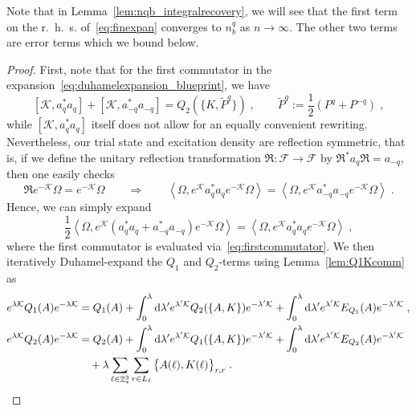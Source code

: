 \documentclass[12pt,a4paper]{article}
\numberwithin{equation}{section}
\newcommand{\cF}{\mathcal{F}}
\newcommand{\cK}{\mathcal{K}}
\newcommand{\fR}{\mathfrak{R}}
\newcommand{\1}{\mathbb{I}}
\newcommand{\di}{\textnormal{d}}
\DeclareMathOperator{\Z}{\mathbb{Z}}
\newcommand{\half}{\frac{1}{2}}
\newcommand{\eva}[1]{\left\langle #1 \right\rangle}
\theoremstyle{plain}
\theoremstyle{definition}
\theoremstyle{remark}
\theoremstyle{plain}
\theoremstyle{definition}
\theoremstyle{remark}
\begin{document}
Note that in Lemma~\ref{lem:nqb_integralrecovery}, we will see that the first term on the r.~h.~s. of~\eqref{eq:finexpan} converges to $ n_b^q $ as $ n \to \infty $. The other two terms are error terms which we bound below.


\begin{proof}
First, note that for the first commutator in the expansion~\eqref{eq:duhamelexpansion_blueprint}, we have
\begin{equation} \label{eq:firstcommutator}
	[\cK, a_q^* a_q] + [\cK, a_{-q}^* a_{-q}]
	= Q_2(\{K,\tilde{P}^q\}) \;, \qquad
	\tilde{P}^q := \half(P^q + P^{-q}) \;,
\end{equation}
while $ [\cK, a_q^* a_q] $ itself does not allow for an equally convenient rewriting. Nevertheless, our trial state and excitation density are reflection symmetric, that is, if we define the unitary reflection transformation $ \fR: \cF \to \cF $ by $ \fR^* a_q \fR = a_{-q} $, then one easily checks
\begin{equation} \label{eq:reflectionsymmetry}
	\fR e^{-\cK} \Omega = e^{-\cK} \Omega \qquad \Rightarrow \qquad
	\eva{\Omega, e^{\cK} a^*_q a_q e^{-\cK}\Omega} = \eva{\Omega, e^{\cK} a^*_{-q} a_{-q} e^{-\cK} \Omega} \;.
\end{equation}
Hence, we can simply expand
\begin{equation}
	\half \eva{\Omega, e^{\cK} (a_q^* a_q + a_{-q}^* a_{-q}) e^{-\cK} \Omega} 
	= \eva{\Omega, e^{\cK} a_q^* a_q e^{-\cK} \Omega} \;,
\end{equation}
where the first commutator is evaluated via~\eqref{eq:firstcommutator}. We then iteratively Duhamel-expand the $ Q_1 $ and $ Q_2 $-terms using Lemma~\ref{lem:Q1Kcomm} as
\begin{equation}
\begin{aligned}
	e^{\lambda \cK} Q_1(A) e^{-\lambda \cK}
	&= Q_1(A) + \int_0^{\lambda} \di \lambda' e^{\lambda' \cK} Q_2(\{A,K\}) e^{-\lambda' \cK}
		+ \int_0^{\lambda} \di \lambda' e^{\lambda' \cK} E_{Q_1}(A) e^{-\lambda' \cK} \;, \\
	e^{\lambda \cK} Q_2(A) e^{-\lambda \cK}
	&= Q_2(A) + \int_0^{\lambda} \di \lambda' e^{\lambda' \cK} Q_1(\{A,K\}) e^{-\lambda' \cK}
		+ \int_0^{\lambda} \di \lambda' e^{\lambda' \cK} E_{Q_2}(A) e^{-\lambda' \cK} \\
	&\quad + \lambda \sum\limits_{\ell \in \Z^3_*} \sum\limits_{r \in L_{\ell}} \big\{ A(\ell), K(\ell) \big\}_{r,r} \;.
\end{aligned}

\end{equation}
\end{proof}
\end{document}
